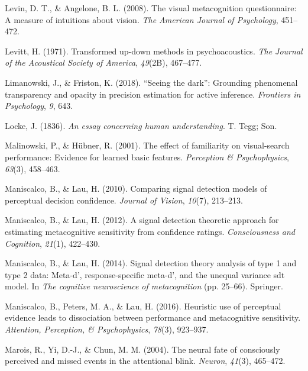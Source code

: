 \documentclass[12pt,twoside]{reedthesis}
\begin{document}
\leavevmode\hypertarget{ref-levin2008visual}{}%
Levin, D. T., \& Angelone, B. L. (2008). The visual metacognition questionnaire: A measure of intuitions about vision. \emph{The American Journal of Psychology}, 451--472.

\leavevmode\hypertarget{ref-levitt1971transformed}{}%
Levitt, H. (1971). Transformed up-down methods in psychoacoustics. \emph{The Journal of the Acoustical Society of America}, \emph{49}(2B), 467--477.

\leavevmode\hypertarget{ref-limanowski2018seeing}{}%
Limanowski, J., \& Friston, K. (2018). ``Seeing the dark'': Grounding phenomenal transparency and opacity in precision estimation for active inference. \emph{Frontiers in Psychology}, \emph{9}, 643.

\leavevmode\hypertarget{ref-locke1836essay}{}%
Locke, J. (1836). \emph{An essay concerning human understanding}. T. Tegg; Son.

\leavevmode\hypertarget{ref-malinowski2001effect}{}%
Malinowski, P., \& Hübner, R. (2001). The effect of familiarity on visual-search performance: Evidence for learned basic features. \emph{Perception \& Psychophysics}, \emph{63}(3), 458--463.

\leavevmode\hypertarget{ref-maniscalco2010comparing}{}%
Maniscalco, B., \& Lau, H. (2010). Comparing signal detection models of perceptual decision confidence. \emph{Journal of Vision}, \emph{10}(7), 213--213.

\leavevmode\hypertarget{ref-maniscalco2012signal}{}%
Maniscalco, B., \& Lau, H. (2012). A signal detection theoretic approach for estimating metacognitive sensitivity from confidence ratings. \emph{Consciousness and Cognition}, \emph{21}(1), 422--430.

\leavevmode\hypertarget{ref-maniscalco2014signal}{}%
Maniscalco, B., \& Lau, H. (2014). Signal detection theory analysis of type 1 and type 2 data: Meta-d', response-specific meta-d', and the unequal variance sdt model. In \emph{The cognitive neuroscience of metacognition} (pp. 25--66). Springer.

\leavevmode\hypertarget{ref-maniscalco2016heuristic}{}%
Maniscalco, B., Peters, M. A., \& Lau, H. (2016). Heuristic use of perceptual evidence leads to dissociation between performance and metacognitive sensitivity. \emph{Attention, Perception, \& Psychophysics}, \emph{78}(3), 923--937.

\leavevmode\hypertarget{ref-marois2004neural}{}%
Marois, R., Yi, D.-J., \& Chun, M. M. (2004). The neural fate of consciously perceived and missed events in the attentional blink. \emph{Neuron}, \emph{41}(3), 465--472.
\end{document}
